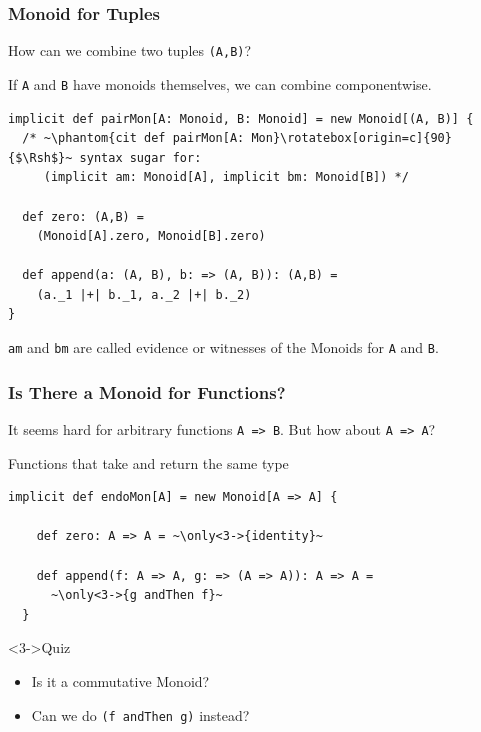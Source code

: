 \documentclass{beamer}
\begin{document}
\begin{frame}[fragile]\frametitle{Monoid for Tuples}
  How can we combine two tuples \texttt{(A,B)}?
  \pause

  If \texttt{A} and \texttt{B} have monoids themselves, we can \alert{combine componentwise}.

  \begin{block}{}
  \begin{lstlisting}
implicit def pairMon[A: Monoid, B: Monoid] = new Monoid[(A, B)] {
  /* ~\phantom{cit def pairMon[A: Mon}\rotatebox[origin=c]{90}{$\Rsh$}~ syntax sugar for:
     (implicit am: Monoid[A], implicit bm: Monoid[B]) */

  def zero: (A,B) =
    (Monoid[A].zero, Monoid[B].zero)

  def append(a: (A, B), b: => (A, B)): (A,B) =
    (a._1 |+| b._1, a._2 |+| b._2)
}
  \end{lstlisting}
  \end{block}

  \texttt{am} and \texttt{bm} are called \alert{evidence} or
  \alert{witnesses} of the Monoids for \texttt{A} and \texttt{B}.
\end{frame}


\begin{frame}[fragile]\frametitle{Is There a Monoid for Functions?}
  It seems hard for arbitrary functions \texttt{A => B}.
  \pause
  But how about \alert{\texttt{A => A}}?

  \begin{block}{Functions that take and return the same type}

  \begin{lstlisting}
implicit def endoMon[A] = new Monoid[A => A] {

    def zero: A => A = ~\only<3->{identity}~

    def append(f: A => A, g: => (A => A)): A => A =
      ~\only<3->{g andThen f}~
  }
  \end{lstlisting}
  \end{block}
  \begin{block}<3->{Quiz}
    \begin{itemize}
      \item Is it a commutative Monoid?
      \item Can we do \texttt{(f andThen g)} instead?
    \end{itemize}
  \end{block}
\end{frame}
\end{document}
